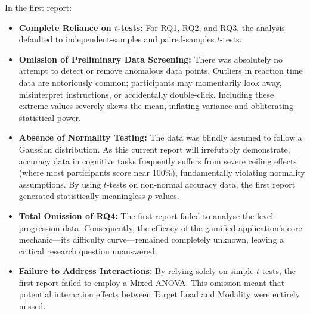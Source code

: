 \documentclass[11pt,a4paper]{article}
\begin{document}
In the first report:
\begin{itemize}
    \item \textbf{Complete Reliance on $t$-tests:} For RQ1, RQ2, and RQ3, the analysis defaulted to independent-samples and paired-samples $t$-tests. 
    \item \textbf{Omission of Preliminary Data Screening:} There was absolutely no attempt to detect or remove anomalous data points. Outliers in reaction time data are notoriously common; participants may momentarily look away, misinterpret instructions, or accidentally double-click. Including these extreme values severely skews the mean, inflating variance and obliterating statistical power.
    \item \textbf{Absence of Normality Testing:} The data was blindly assumed to follow a Gaussian distribution. As this current report will irrefutably demonstrate, accuracy data in cognitive tasks frequently suffers from severe ceiling effects (where most participants score near 100\%), fundamentally violating normality assumptions. By using $t$-tests on non-normal accuracy data, the first report generated statistically meaningless $p$-values.
    \item \textbf{Total Omission of RQ4:} The first report failed to analyse the level-progression data. Consequently, the efficacy of the gamified application's core mechanic—its difficulty curve—remained completely unknown, leaving a critical research question unanswered.
    \item \textbf{Failure to Address Interactions:} By relying solely on simple $t$-tests, the first report failed to employ a Mixed ANOVA. This omission meant that potential interaction effects between Target Load and Modality were entirely missed. 
\end{itemize}
\end{document}
